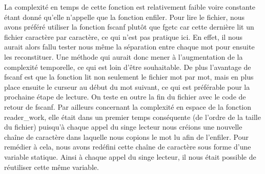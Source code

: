 \documentclass[12pt]{article}
\begin{document}
La complexité en temps de cette fonction est relativement faible voire constante étant donné qu'elle n'appelle que la fonction enfiler. Pour lire le fichier, nous avons préféré utiliser la fonction fscanf plutôt que fgetc car cette dernière lit un fichier caractère par caractère, ce qui n'est pas pratique ici. En effet, il nous aurait alors fallu tester nous même la séparation entre chaque mot pour ensuite les reconstituer. Une méthode qui aurait donc mener à l'augmentation de la complexité temporelle, ce qui est loin d'être souhaitable. De plus l'avantage de fscanf est que la fonction lit non seulement le fichier mot par mot, mais en plus place ensuite le curseur au début du mot suivant, ce qui est préférable pour la prochaine étape de lecture. On teste en outre la fin du fichier avec le code de retour de fscanf.
Par ailleurs concernant la complexité en espace de la fonction reader\_work, elle était dans un premier temps conséquente (de l'ordre de la taille du fichier) puisqu'à chaque appel du singe lecteur nous créions une nouvelle chaîne de caractère dans laquelle nous copions le mot lu afin de l'enfiler. Pour remédier à cela, nous avons redéfini cette chaîne de caractère sous forme d'une variable statique. Ainsi à chaque appel du singe lecteur, il nous était possible de réutiliser cette même variable.
\end{document}
